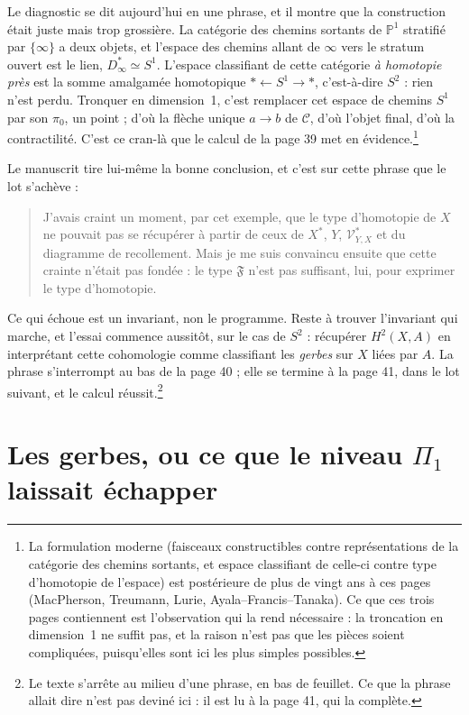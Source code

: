\documentclass[11pt,a4paper]{article}
\begin{document}
Le diagnostic se dit aujourd'hui en une phrase, et il montre que la construction
était juste mais trop grossière. La catégorie des chemins sortants de $\mathbb{P}^{1}$ stratifié par
$\{\infty\}$ a deux objets, et l'espace des chemins allant de $\infty$ vers le
stratum ouvert est le lien, $D^{*}_{\infty} \simeq S^{1}$. L'espace classifiant
de cette catégorie \emph{à homotopie près} est la somme amalgamée homotopique
$\ast \leftarrow S^{1} \to \ast$, c'est-à-dire $S^{2}$ : rien n'est perdu.
Tronquer en dimension~1, c'est remplacer cet espace de chemins $S^{1}$ par son
$\pi_{0}$, un point ; d'où la flèche unique $a \to b$ de $\mathcal{C}$, d'où
l'objet final, d'où la contractilité. C'est ce cran-là que le calcul
de la page 39 met en évidence.\footnote{La formulation moderne (faisceaux
constructibles contre représentations de la catégorie des chemins sortants,
et espace classifiant de celle-ci contre type d'homotopie de l'espace) est
postérieure de plus de vingt ans à ces pages (MacPherson, Treumann, Lurie,
Ayala--Francis--Tanaka). Ce que ces trois pages contiennent est l'observation qui
la rend nécessaire : la troncation en dimension~1 ne suffit pas, et la
raison n'est pas que les pièces soient compliquées, puisqu'elles sont ici les
plus simples possibles.}

Le manuscrit tire lui-même la bonne conclusion, et c'est sur cette phrase que le
lot s'achève :

\begin{quote}
J'avais craint un moment, par cet exemple, que le type d'homotopie de $X$ ne
pouvait pas se récupérer à partir de ceux de $X^{*}$, $Y$,
$\mathcal{V}^{*}_{Y,X}$ et du diagramme de recollement. Mais je me suis
convaincu ensuite que cette crainte n'était pas fondée : le type $\mathfrak{F}$
n'est pas suffisant, lui, pour exprimer le type d'homotopie.
\end{quote}

Ce qui échoue est un invariant, non le programme. Reste à trouver l'invariant
qui marche, et l'essai commence aussitôt, sur le cas de $S^{2}$ : récupérer
$H^{2}(X,A)$ en interprétant cette cohomologie comme classifiant les
\emph{gerbes} sur $X$ liées par $A$. La phrase s'interrompt au bas de la page
40 ; elle se termine à la page 41, dans le lot suivant, et le calcul
réussit.\footnote{Le texte s'arrête au milieu d'une phrase, en bas de feuillet.
Ce que la phrase allait dire n'est pas deviné ici : il est lu à la page 41, qui
la complète.}

\section*{Les gerbes, ou ce que le niveau $\Pi_{1}$ laissait échapper}
\end{document}
